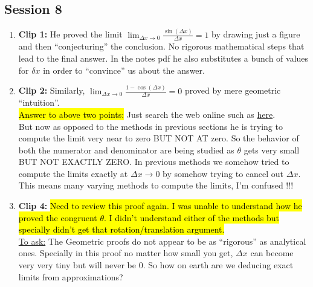 \documentclass[]{article}
\DeclareRobustCommand{\hlgreen}[1]{{\sethlcolor{green}\hl{#1}}}
\DeclareRobustCommand{\hlyellow}[1]{{\sethlcolor{yellow}\hl{#1}}}
\begin{document}
\subsection{Session 8}
\begin{enumerate}
	\item \textbf{Clip 1:} He proved the limit $\lim_{\Delta x\to0}\frac{\sin(\Delta x)}{\Delta x}= 1$ by drawing just a figure and then ``conjecturing'' the conclusion. No rigorous mathematical steps that lead to the final answer. In the notes pdf he also substitutes a bunch of values for $\delta x$ in order to ``convince'' us about the answer.
	
	\item \textbf{Clip 2:} Similarly, $\lim_{\Delta x\to0}\frac{1-\cos(\Delta x)}{\Delta x}= 0$ proved by mere geometric ``intuition''. \\
	
	\hlgreen{Answer to above two points:} Just search the web online such as \href{https://math.stackexchange.com/questions/75130/how-to-prove-that-lim-limits-x-to0-frac-sin-xx-1}{here}.\\
	
	But now as opposed to the methods in previous sections he is trying to compute the limit very near to zero BUT NOT AT zero. So the behavior of both the numerator and denominator are being studied as $\theta$ gets very small BUT NOT EXACTLY ZERO. In previous methods we somehow tried to compute the limits exactly at $\Delta x\to 0$ by somehow trying to cancel out $\Delta x$. This means many varying methods to compute the limits, I'm confused !!!
	
	\item \textbf{Clip 4:} \hlyellow{Need to review this proof again. I was unable to understand how he proved the congruent $\theta$. I didn't understand either of the methods but specially didn't get that rotation/translation argument.}\\
	
	\underline{To ask:} The Geometric proofs do not appear to be as ``rigorous'' as analytical ones. Specially in this proof no matter how small you get, $\Delta x$ can become very very tiny but will never be 0. So how on earth are we deducing exact limits from approximations?
	
	

\end{enumerate}
\end{document}
